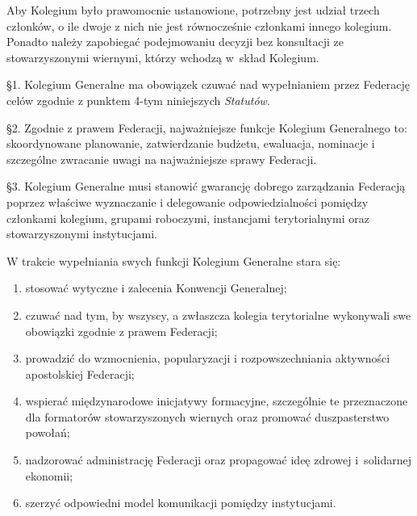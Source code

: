  Aby Kolegium było prawomocnie ustanowione, potrzebny jest udział trzech członków, o ile dwoje z nich nie jest równocześnie członkami innego kolegium. Ponadto należy zapobiegać podejmowaniu decyzji bez konsultacji ze stowarzyszonymi wiernymi, którzy wchodzą \mbox{w skład} Kolegium.
 


 \S{}1. Kolegium Generalne ma obowiązek czuwać nad wypełnianiem przez Federację celów zgodnie z punktem 4-tym niniejszych {\em Statutów}.


\S{}2. Zgodnie z prawem Federacji, najważniejsze funkcje Kolegium Generalnego to: skoordynowane planowanie, zatwierdzanie budżetu, ewaluacja, nominacje i szczególne zwracanie uwagi na najważniejsze sprawy Federacji.


\S{}3. Kolegium Generalne musi stanowić gwarancję dobrego zarządzania Federacją poprzez właściwe wyznaczanie i delegowanie odpowiedzialności pomiędzy członkami kolegium, grupami roboczymi, instancjami terytorialnymi oraz stowarzyszonymi instytucjami.




 W trakcie wypełniania swych funkcji Kolegium Generalne stara się:


\begin{enumerate}


\item stosować wytyczne i zalecenia Konwencji Generalnej;


\item czuwać nad tym, by wszyscy, a zwłaszcza kolegia terytorialne wykonywali swe obowiązki zgodnie z prawem Federacji;


\item prowadzić do wzmocnienia, popularyzacji i rozpowszechniania aktywności apostolskiej Federacji;


\item wspierać międzynarodowe inicjatywy formacyjne, szczególnie te przeznaczone dla formatorów stowarzyszonych wiernych oraz promować duszpasterstwo powołań;


\item nadzorować administrację Federacji oraz propagować ideę zdrowej \mbox{i solidarnej} ekonomii;


\item szerzyć odpowiedni model komunikacji pomiędzy instytucjami.


\end{enumerate}
 
